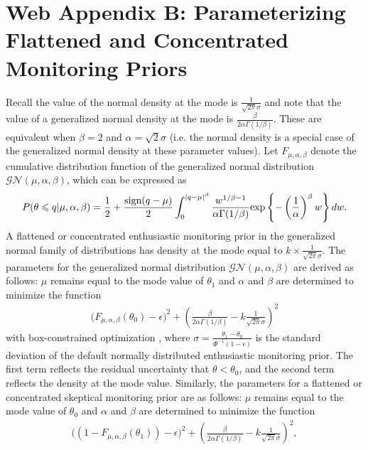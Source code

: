 \documentclass[useAMS,usenatbib,referee]{biom}
\begin{document}
\section*{Web Appendix B: Parameterizing Flattened and Concentrated Monitoring Priors}\label{sec:gen_normal_details}

Recall the value of the normal density at the mode is $\frac{1}{\sqrt{2\pi}\sigma}$ and note that the value of a generalized normal density at the mode is $\frac{\beta}{2\alpha\Gamma(1/\beta)}$. These are equivalent when $\beta=2$ and $\alpha=\sqrt{2}\sigma$ (i.e. the normal density is a special case of the generalized normal density at these parameter values). Let $F_{\mu,\alpha,\beta}$ denote the cumulative distribution function of the generalized normal distribution $\mathcal{GN}(\mu,\alpha,\beta)$, which can be expressed as \citep{Griffin2018}
\begin{align*}
P(\theta\leqslant q|\mu,\alpha,\beta)=\frac{1}{2}+\frac{{\mathrm{sign}}(q-\mu)}{2}\int_0^{|q-\mu|^\beta}\frac{w^{1/\beta-1}}{\alpha\Gamma(1/\beta)}{\mathrm{exp}}\left\{-\left(\frac{1}{\alpha}\right)^\beta w\right\} dw.
\end{align*}
%
A flattened or concentrated enthusiastic monitoring prior in the generalized normal family of distributions has density at the mode equal to $k\times \frac{1}{\sqrt{2\pi}\sigma}$. 
%
The parameters for the generalized normal distribution $\mathcal{GN}(\mu,\alpha,\beta)$ are derived as follows: $\mu$ remains equal to the mode value of $\theta_1$ and $\alpha$ and $\beta$ are determined to minimize the function 
\begin{align*}
\bigg(F_{\mu,\alpha,\beta}(\theta_0)-\epsilon\bigg)^2+\left(\frac{\beta}{2\alpha\Gamma(1/\beta)}-k \frac{1}{\sqrt{2\pi}\sigma}\right)^2
\end{align*} with box-constrained optimization \citep{Byrd1995}, where $\sigma=\frac{\theta_1-\theta_0}{\Phi^{-1}(1-\epsilon)}$ is the standard deviation of the default normally distributed enthusiastic monitoring prior. The first term reflects the residual uncertainty that $\theta<\theta_0$, and the second term reflects the density at the mode value. Similarly, the parameters for a flattened or concentrated skeptical monitoring prior are as follows: $\mu$ remains equal to the mode value of $\theta_0$ and $\alpha$ and $\beta$ are determined to minimize the function 
\begin{align*}
\bigg((1-F_{\mu,\alpha,\beta}(\theta_1))-\epsilon\bigg)^2+\left(\frac{\beta}{2\alpha\Gamma(1/\beta)}-k \frac{1}{\sqrt{2\pi}\sigma}\right)^2,
\end{align*} 
\end{document}
